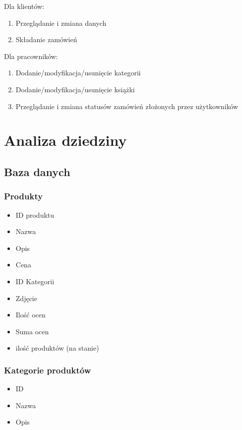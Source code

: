 \documentclass[pdflatex,11pt]{aghdpl}
\begin{document}
Dla klientów:
\begin{enumerate}
\item Przeglądanie i zmiana danych
\item Składanie zamówień
\end{enumerate}

Dla pracowników:
\begin{enumerate}
\item Dodanie/modyfikacja/usunięcie kategorii
\item Dodanie/modyfikacja/usunięcie książki
\item Przeglądanie i zmiana statusów zamówień złożonych przez użytkowników
\end{enumerate}



\chapter{Analiza dziedziny}

\section{Baza danych}

\subsection{Produkty}
\begin{itemize}
\item ID produktu
\item Nazwa
\item Opis
\item Cena
\item ID Kategorii
\item Zdjęcie
\item Ilość ocen
\item Suma ocen
\item ilość produktów (na stanie)
\end{itemize}

\subsection{Kategorie produktów}
\begin{itemize}
\item ID
\item Nazwa
\item Opis
\end{itemize}
\end{document}

